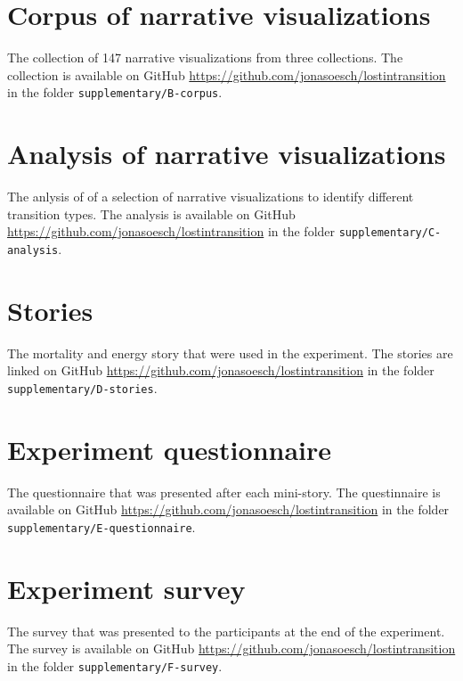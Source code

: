 \newpage
\begin{flushleft}
\section{Corpus of narrative visualizations} \label{appendix-corpus}

The collection of 147 narrative visualizations from three collections. The collection is available on GitHub \url{https://github.com/jonasoesch/lostintransition} in the folder \texttt{supplementary/B-corpus}.

\section{Analysis of narrative visualizations} \label{appendix-transition-analysis}

The anlysis of of a selection of narrative visualizations to identify different transition types. The analysis is available on GitHub \url{https://github.com/jonasoesch/lostintransition} in the folder \texttt{supplementary/C-analysis}.


\section{Stories} \label{appendix-story}

The mortality and energy story that were used in the experiment. The stories are linked on GitHub \url{https://github.com/jonasoesch/lostintransition} in the folder \texttt{supplementary/D-stories}.


\section{Experiment questionnaire} \label{appendix-questionnaire}

The questionnaire that was presented after each mini-story. The questinnaire is available on GitHub \url{https://github.com/jonasoesch/lostintransition} in the folder \texttt{supplementary/E-questionnaire}.


\section{Experiment survey} \label{appendix-survey}

The survey that was presented to the participants at the end of the experiment. The survey is available on GitHub \url{https://github.com/jonasoesch/lostintransition} in the folder \texttt{supplementary/F-survey}.



\end{flushleft}
